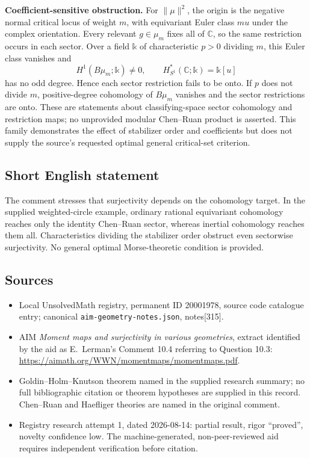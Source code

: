 \documentclass[11pt]{article}
\newcommand{\C}{\mathbb{C}}
\begin{document}
\textbf{Coefficient-sensitive obstruction.} For $\|\mu\|^2$, the origin is the negative normal critical locus of weight $m$, with equivariant Euler class $m u$ under the complex orientation. Every relevant $g\in\mu_m$ fixes all of $\C$, so the same restriction occurs in each sector. Over a field $\mathbb k$ of characteristic $p>0$ dividing $m$, this Euler class vanishes and
\[
 H^1(B\mu_m;\mathbb k)\ne0,
 \qquad H^*_{S^1}(\C;\mathbb k)=\mathbb k[u]
\]
has no odd degree. Hence each sector restriction fails to be onto. If $p$ does not divide $m$, positive-degree cohomology of $B\mu_m$ vanishes and the sector restrictions are onto. These are statements about classifying-space sector cohomology and restriction maps; no unprovided modular Chen--Ruan product is asserted. This family demonstrates the effect of stabilizer order and coefficients but does not supply the source's requested optimal general critical-set criterion.
\subsection{Short English statement}
The comment stresses that surjectivity depends on the cohomology target. In the supplied weighted-circle example, ordinary rational equivariant cohomology reaches only the identity Chen--Ruan sector, whereas inertial cohomology reaches them all. Characteristics dividing the stabilizer order obstruct even sectorwise surjectivity. No general optimal Morse-theoretic condition is provided.
\subsection{Sources}
\begin{itemize}
\item Local UnsolvedMath registry, permanent ID 20001978, source code catalogue entry; canonical \texttt{aim-geometry-notes.json}, notes[315].
\item AIM \emph{Moment maps and surjectivity in various geometries}, extract identified by the aid as E.~Lerman's Comment 10.4 referring to Question 10.3: \url{https://aimath.org/WWN/momentmaps/momentmaps.pdf}.
\item Goldin--Holm--Knutson theorem named in the supplied research summary; no full bibliographic citation or theorem hypotheses are supplied in this record. Chen--Ruan and Haefliger theories are named in the original comment.
\item Registry research attempt 1, dated 2026-08-14: partial result, rigor ``proved'', novelty confidence low. The machine-generated, non-peer-reviewed aid requires independent verification before citation.
\end{itemize}
\end{document}

